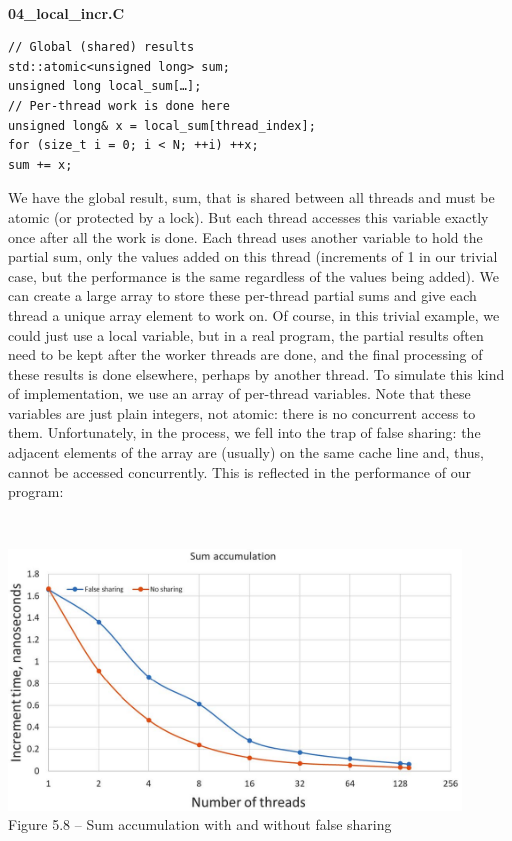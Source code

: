 \hspace*{\fill} \\ %
\noindent
\textbf{04\_local\_incr.C}
\begin{lstlisting}[style=styleCXX]
// Global (shared) results
std::atomic<unsigned long> sum;
unsigned long local_sum[…];
// Per-thread work is done here
unsigned long& x = local_sum[thread_index];
for (size_t i = 0; i < N; ++i) ++x;
sum += x;
\end{lstlisting}

We have the global result, sum, that is shared between all threads and must be atomic (or protected by a lock). But each thread accesses this variable exactly once after all the work is done. Each thread uses another variable to hold the partial sum, only the values added on this thread (increments of 1 in our trivial case, but the performance is the same regardless of the values being added). We can create a large array to store these per-thread partial sums and give each thread a unique array element to work on. Of course, in this trivial example, we could just use a local variable, but in a real program, the partial results often need to be kept after the worker threads are done, and the final processing of these results is done elsewhere, perhaps by another thread. To simulate this kind of implementation, we use an array of per-thread variables. Note that these variables are just plain integers, not atomic: there is no concurrent access to them. Unfortunately, in the process, we fell into the trap of false sharing: the adjacent elements of the array are (usually) on the same cache line and, thus, cannot be accessed concurrently. This is reflected in the performance of our program:

\hspace*{\fill} \\ %
\begin{center}
\includegraphics[width=0.9\textwidth]{content/1/chapter5/images/8.jpg}\\
Figure 5.8 – Sum accumulation with and without false sharing
\end{center}

